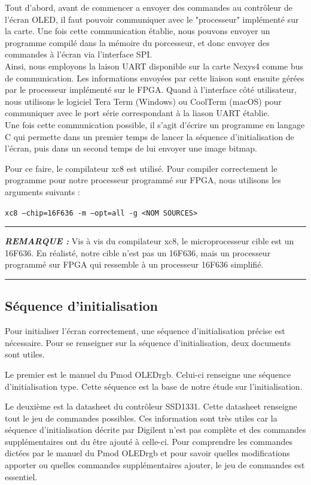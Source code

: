 \documentclass[11pt]{article}
\newcommand{\HRule}{\rule{\linewidth}{0.5mm}}
\newenvironment{rmq}[1] {\noindent\HRule\par\vspace{5pt}\textbf{\textit{REMARQUE : }}#1}{\\\HRule\par\vspace{5pt}}
\begin{document}
Tout d'abord, avant de commencer a envoyer des commandes au contrôleur de l'écran OLED, il faut pouvoir communiquer avec le "processeur" implémenté sur la carte. Une fois cette communication établie, nous pouvons envoyer un programme compilé dans la mémoire du porcesseur, et donc envoyer des commandes à l'écran via l'interface SPI. \\

Ainsi, nous employons la laison UART disponible sur la carte Nexys4 comme bus de communication. Les informations envoyées par cette liaison sont ensuite gérées par le processeur implémenté sur le FPGA. Quand à l'interface côté utilisateur, nous utilisons le logiciel Tera Term (Windows) ou CoolTerm (macOS) pour communiquer avec le port série correspondant à la liason UART établie. \\

Une fois cette communication possible, il s'agit d'écrire un programme en langage C qui permette dans un premier temps de lancer la séquence d'initialisation de l'écran, puis dans un second temps de lui envoyer une image bitmap. 

Pour ce faire, le compilateur xc8 est utilisé. Pour compiler correctement le programme pour notre processeur programmé sur FPGA, nous utilisons les arguments suivants : 
\begin{center}
    \texttt{xc8 --chip=16F636 -m --opt=all -g <NOM SOURCES>}
\end{center}

\begin{rmq}
    Vis à vis du compilateur xc8, le microprocesseur cible est un 16F636. En réalisté, notre cible n'est pas un 16F636, mais un processeur programmé sur FPGA qui ressemble à un processeur 16F636 simplifié. 
\end{rmq}

\subsection{Séquence d'initialisation}

Pour initialiser l'écran correctement, une séquence d'initialisation précise est nécessaire. Pour se renseigner sur la séquence d'initialisation, deux documents sont utiles. 

Le premier est le manuel du Pmod OLEDrgb\cite{oledrgb}. Celui-ci renseigne une séquence d'initialisation type. Cette séquence est la base de notre étude sur l'initialisation. 

Le deuxième est la datasheet du contrôleur SSD1331\cite{ssd1331}. Cette datasheet renseigne tout le jeu de commandes possibles. Ces information sont très utiles car la séquence d'initialisation décrite par Digilent n'est pas complète et des commandes supplémentaires ont du être ajouté à celle-ci. Pour comprendre les commandes dictées par le manuel du Pmod OLEDrgb et pour savoir quelles modifications apporter ou quelles commandes supplémentaires ajouter, le jeu de commandes est essentiel. \\
\end{document}
